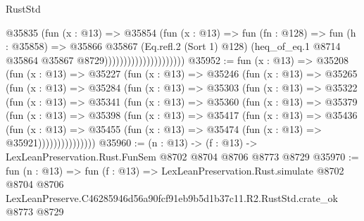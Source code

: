 \begin{lexlean}{RustStd}
\begin{coremodule}
                                      @35835
                                        (fun (x : @13) =>
                                        @35854
                                          (fun (x : @13) =>
                                          fun (fn : @128) =>
                                          fun (h : @35858) =>
                                          @35866
                                            @35867
                                            (Eq.refl.{2} (Sort 1) @128)
                                            (heq_of_eq.{1}
                                              @8714
                                              @35864
                                              @35867
                                              @8729)))))))))))))))))))))
@35952 := fun (x : @13) =>
  @35208
    (fun (x : @13) =>
    @35227
      (fun (x : @13) =>
      @35246
        (fun (x : @13) =>
        @35265
          (fun (x : @13) =>
          @35284
            (fun (x : @13) =>
            @35303
              (fun (x : @13) =>
              @35322
                (fun (x : @13) =>
                @35341
                  (fun (x : @13) =>
                  @35360
                    (fun (x : @13) =>
                    @35379
                      (fun (x : @13) =>
                      @35398
                        (fun (x : @13) =>
                        @35417
                          (fun (x : @13) =>
                          @35436
                            (fun (x : @13) =>
                            @35455 (fun (x : @13) => @35474 (fun (x : @13) => @35921)))))))))))))))
@35960 := (n : @13) -> (f : @13) -> LexLeanPreservation.Rust.FunSem @8702 @8704 @8706 @8773 @8729
@35970 := fun (n : @13) =>
  fun (f : @13) =>
  LexLeanPreservation.Rust.simulate
    @8702
    @8704
    @8706
    LexLeanPreserve.C46285946d56a90fcf91eb9b5d1b37c11.R2.RustStd.crate_ok
    @8773
    @8729
\end{coremodule}
\end{lexlean}
